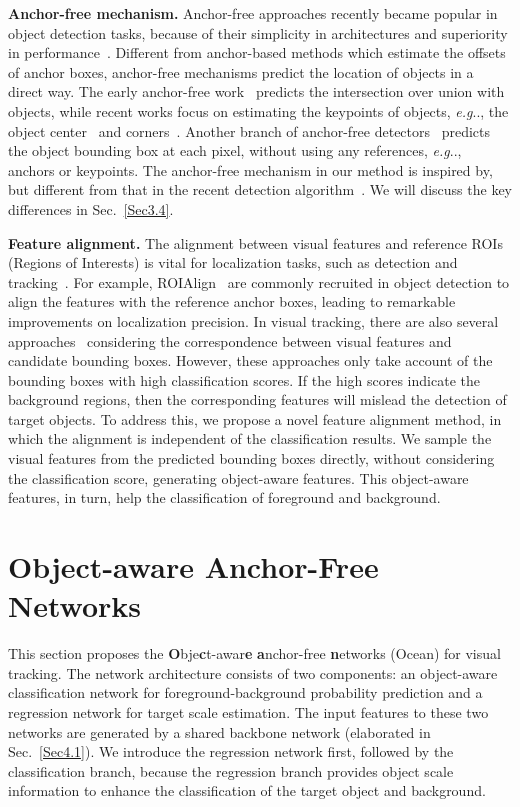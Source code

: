 \documentclass[runningheads]{llncs}
\makeatletter
\DeclareRobustCommand\onedot{\futurelet\@let@token\@onedot}
\def\@onedot{\ifx\@let@token.\else.\null\fi\xspace}
\def\eg{\emph{e.g}\onedot} \def\Eg{\emph{E.g}\onedot}
\makeatother
\begin{document}
\textbf{Anchor-free mechanism.} Anchor-free approaches recently became popular in object detection tasks, because of their simplicity in architectures and superiority in performance~\cite{CenterNet,CornerNet,FCOS}. 
Different from anchor-based methods which estimate the offsets of anchor boxes, anchor-free mechanisms predict the location of objects in a direct way. 
The early anchor-free work~\cite{Unitbox} predicts the intersection over union with objects, while recent works focus on estimating the keypoints of objects, \eg, the object center~\cite{CenterNet} and corners~\cite{CornerNet}. Another branch of anchor-free detectors~\cite{YOLO,FCOS} predicts the object bounding box at each pixel, without using any references, \eg, anchors or keypoints. The anchor-free mechanism in our method is inspired by, but different from that in the recent detection algorithm~\cite{FCOS}. We will discuss the key differences in Sec.~\ref{Sec3.4}. 




\textbf{Feature alignment.} The alignment between visual features and reference ROIs (Regions of Interests) is vital for localization tasks, such as detection and tracking~\cite{CascadeRPN}. For example, ROIAlign~\cite{MASKRCNN} are commonly recruited in object detection to align the features with the reference anchor boxes, leading to remarkable improvements on localization precision. In visual tracking, there are also several approaches~\cite{RT-MDNet,SPM} considering the correspondence between visual features and candidate bounding boxes. However, these approaches only take account of the bounding boxes with high classification scores. If the high scores indicate the background regions, then the corresponding features will mislead the detection of target objects. To address this, we propose a novel feature alignment method, in which the alignment is independent of the classification results. We sample the visual features from the predicted bounding boxes directly, without considering the classification score, generating object-aware features. This object-aware features, in turn, help the classification of foreground and background.


\vspace{-0.5em}
\section{Object-aware Anchor-Free Networks} \label{Sec3}
\vspace{-0.3em}
This section proposes the \textbf{O}bje\textbf{c}t-awar\textbf{e} \textbf{a}nchor-free \textbf{n}etworks (Ocean) for visual tracking. The network architecture consists of two components: an object-aware classification network for foreground-background probability prediction and a regression network for target scale estimation. The input features to these two networks are generated by a shared backbone network (elaborated in Sec.~\ref{Sec4.1}). We introduce the regression network first, followed by the classification branch, because the regression branch provides object scale information to enhance the classification of the target object and background.
\end{document}
